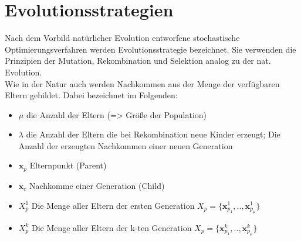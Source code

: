 \section[Allgemeines]{Evolutionsstrategien}
Nach dem Vorbild natürlicher Evolution entworfene stochastische Optimierungsverfahren werden Evolutionsstrategie bezeichnet. Sie verwenden die Prinzipien der Mutation, Rekombination und Selektion analog zu der nat. Evolution.\\
Wie in der Natur auch werden Nachkommen aus der Menge der verfügbaren Eltern gebildet. Dabei bezeichnet im Folgenden:
\begin{itemize}
\item $\mu$ die Anzahl der Eltern (=> Größe der Population)
\item $\lambda$ die Anzahl der Eltern die bei Rekombination neue Kinder erzeugt; Die Anzahl der erzeugten Nachkommen einer neuen Generation
\item $\mathbf{x}_p$ Elternpunkt (Parent)
\item $\mathbf{x}_c$ Nachkomme einer Generation (Child)
\item $X_p^1$ Die Menge aller Eltern der ersten Generation $X_p = \{\mathbf{x}_{p_1}^1,..,\mathbf{x}_{p_\mu}^1\}$
\item $X_p^k$ Die Menge aller Eltern der k-ten Generation $X_p = \{\mathbf{x}_{p_1}^k,..,\mathbf{x}_{p_\mu}^k\}$
\end{itemize}
%
